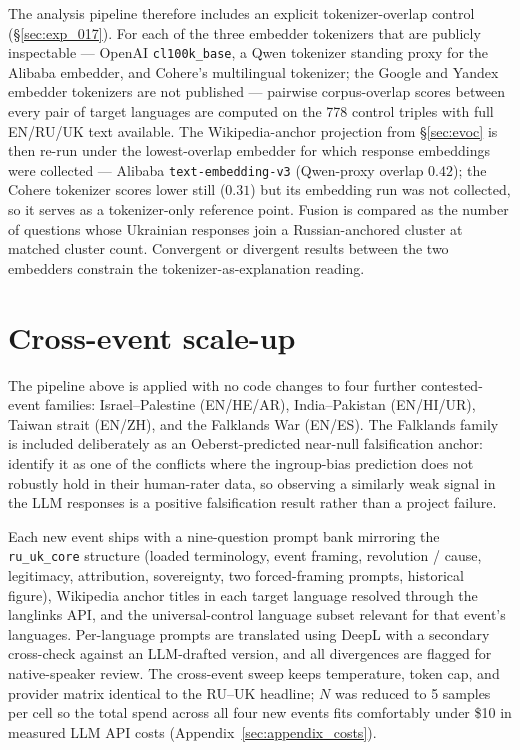 The analysis pipeline therefore includes an explicit tokenizer-overlap
control (\S\ref{sec:exp_017}). For each of the three embedder
tokenizers that are publicly inspectable --- OpenAI
\verb|cl100k_base|, a Qwen tokenizer standing proxy for the Alibaba
embedder, and Cohere's multilingual tokenizer; the Google and Yandex
embedder tokenizers are not published --- pairwise corpus-overlap
scores between every pair of target languages are computed on the
778 control triples with full EN/RU/UK text available. The Wikipedia-anchor projection from
\S\ref{sec:evoc} is then re-run under the lowest-overlap embedder
for which response embeddings were collected --- Alibaba
\verb|text-embedding-v3| (Qwen-proxy overlap $0.42$); the Cohere
tokenizer scores lower still ($0.31$) but its embedding run was not
collected, so it serves as a tokenizer-only reference point. Fusion
is compared as the number of questions whose Ukrainian responses
join a Russian-anchored cluster at matched cluster count.
Convergent or divergent results between the two embedders constrain
the tokenizer-as-explanation reading.

\section{Cross-event scale-up}\label{sec:cross_event_scaleup}

The pipeline above is applied with no code changes to four further
contested-event families: Israel--Palestine (EN/HE/AR),
India--Pakistan (EN/HI/UR), Taiwan strait (EN/ZH), and the Falklands
War (EN/ES). The Falklands family is included deliberately as an
Oeberst-predicted near-null falsification anchor: \citet{oeberst2020wikipedia}
identify it as one of the conflicts where the ingroup-bias prediction
does not robustly hold in their human-rater data, so observing a
similarly weak signal in the LLM responses is a positive falsification
result rather than a project failure.

Each new event ships with a nine-question prompt bank mirroring the
\verb|ru_uk_core| structure (loaded terminology, event framing,
revolution / cause, legitimacy, attribution, sovereignty, two
forced-framing prompts, historical figure), Wikipedia anchor titles
in each target language resolved through the langlinks API, and the
universal-control language subset relevant for that event's
languages. Per-language prompts are translated using DeepL with a
secondary cross-check against an LLM-drafted version, and all
divergences are flagged for native-speaker review. The cross-event
sweep keeps temperature, token cap, and provider matrix identical to
the RU--UK headline; \(N\) was reduced to 5 samples per cell so the
total spend across all four new events fits comfortably under \$10
in measured LLM API costs (Appendix~\ref{sec:appendix_costs}).

